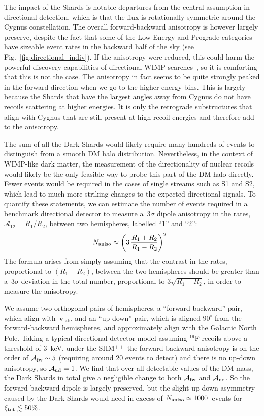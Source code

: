 \documentclass[prd,10pt,twocolumn,showpacs,nofootinbib,aps,superscriptaddress,preprintnumbers]{revtex4-1}
\newcommand{\vlab}{\mathbf{v}_\mathrm{lab}}
\begin{document}
  The impact of the Shards is notable departures from the central assumption 
  in directional detection, which is that the flux is rotationally symmetric around the Cygnus constellation.
 The overall forward-backward anisotropy is however largely preserve, despite
  the fact that some of the Low Energy and Prograde categories have sizeable
  event rates in the backward half of the sky (see Fig.~\ref{fig:directional_indiv}).  
  If the anisotropy were reduced, this could
   harm the powerful discovery capabilities of directional WIMP 
   searches~\cite{Mayet:2016zxu}, so it is comforting that this is not the case.
 The anisotropy in fact seems to be quite strongly peaked in the forward direction 
 when we go to the higher energy bins. This is largely because the Shards that 
 have the largest angles away from Cygnus do not have recoils scattering at 
 higher energies. It is only the retrograde substructures that align with 
 Cygnus that are still present at high recoil energies and therefore add to the anisotropy.
 
The sum of all the Dark Shards would likely require many hundreds of 
events to distinguish from a smooth DM halo distribution. Nevertheless, in 
the context of WIMP-like dark matter, the measurement of the directionality 
of nuclear recoils would likely be the only feasible way to probe this part of 
the DM halo directly. Fewer events would be required in the cases of single 
streams such as S1 and S2, which lead to much more striking changes to the 
expected directional signals. To quantify these statements, we can 
estimate the number of events required in a benchmark directional detector
 to measure a~$3\sigma$ dipole anisotropy in the rates, $\mathcal{A}_{12} = R_1/R_2$, 
 between two hemispheres, labelled ``1'' and ``2'':
\begin{equation}
N_{\rm aniso} \approx \left( 3 \, \frac{R_1 + R_2}{R_1 - R_2} \right)^2 \, .
\end{equation}
The formula arises from simply assuming that the contrast in the 
rates, proportional to $(R_1-R_2)$, between the two hemispheres should be 
greater than a~3$\sigma$ deviation in the total number, proportional to $ 3\sqrt{R_1+R_2}$,
in order to measure the anisotropy.

We assume two orthogonal pairs of hemispheres, a ``forward-backward'' pair, 
which align with~$\vlab$, and an ``up-down'' pair, which is aligned $90^\circ$ 
from the forward-backward hemispheres, and approximately align with the Galactic 
North Pole. Taking a typical directional detector model assuming $^{19}$F 
recoils above a threshold of 3~keV, under the SHM$^{++}$ the forward-backward 
anisotropy is on the order of $\mathcal{A}_{\rm fw}\sim 5$ (requiring around 20 events to detect) 
and there is no up-down anisotropy, so $\mathcal{A}_{\rm ud}=1$. We find that over all 
detectable values of the DM mass, the Dark Shards in total give a negligible change to 
both $\mathcal{A}_{\rm fw}$ and $\mathcal{A}_{\rm ud}$. So the forward-backward 
dipole is largely preserved, but the slight up-down asymmetry caused by the Dark Shards 
would need in excess of $N_{\rm aniso}\simeq 1000$~events for $\xi_{\rm tot} \lesssim 50\%$.
\end{document}
